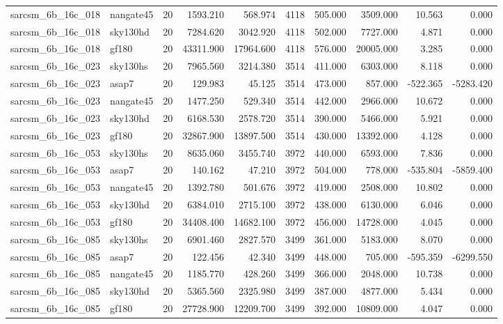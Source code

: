 \begin{longtable}{llrrrrrrrr}
sarcsm\_6b\_16c\_018 & nangate45 & 20 & 1593.210 & 568.974 & 4118 & 505.000 & 3509.000 & 10.563 & 0.000 \\
sarcsm\_6b\_16c\_018 & sky130hd & 20 & 7284.620 & 3042.920 & 4118 & 502.000 & 7727.000 & 4.871 & 0.000 \\
sarcsm\_6b\_16c\_018 & gf180 & 20 & 43311.900 & 17964.600 & 4118 & 576.000 & 20005.000 & 3.285 & 0.000 \\
sarcsm\_6b\_16c\_023 & sky130hs & 20 & 7965.560 & 3214.380 & 3514 & 411.000 & 6303.000 & 8.118 & 0.000 \\
sarcsm\_6b\_16c\_023 & asap7 & 20 & 129.983 & 45.125 & 3514 & 473.000 & 857.000 & -522.365 & -5283.420 \\
sarcsm\_6b\_16c\_023 & nangate45 & 20 & 1477.250 & 529.340 & 3514 & 442.000 & 2966.000 & 10.672 & 0.000 \\
sarcsm\_6b\_16c\_023 & sky130hd & 20 & 6168.530 & 2578.720 & 3514 & 390.000 & 5466.000 & 5.921 & 0.000 \\
sarcsm\_6b\_16c\_023 & gf180 & 20 & 32867.900 & 13897.500 & 3514 & 430.000 & 13392.000 & 4.128 & 0.000 \\
sarcsm\_6b\_16c\_053 & sky130hs & 20 & 8635.060 & 3455.740 & 3972 & 440.000 & 6593.000 & 7.836 & 0.000 \\
sarcsm\_6b\_16c\_053 & asap7 & 20 & 140.162 & 47.210 & 3972 & 504.000 & 778.000 & -535.804 & -5859.400 \\
sarcsm\_6b\_16c\_053 & nangate45 & 20 & 1392.780 & 501.676 & 3972 & 419.000 & 2508.000 & 10.802 & 0.000 \\
sarcsm\_6b\_16c\_053 & sky130hd & 20 & 6384.010 & 2715.100 & 3972 & 438.000 & 6130.000 & 6.046 & 0.000 \\
sarcsm\_6b\_16c\_053 & gf180 & 20 & 34408.400 & 14682.100 & 3972 & 456.000 & 14728.000 & 4.045 & 0.000 \\
sarcsm\_6b\_16c\_085 & sky130hs & 20 & 6901.460 & 2827.570 & 3499 & 361.000 & 5183.000 & 8.070 & 0.000 \\
sarcsm\_6b\_16c\_085 & asap7 & 20 & 122.456 & 42.340 & 3499 & 448.000 & 705.000 & -595.359 & -6299.550 \\
sarcsm\_6b\_16c\_085 & nangate45 & 20 & 1185.770 & 428.260 & 3499 & 366.000 & 2048.000 & 10.738 & 0.000 \\
sarcsm\_6b\_16c\_085 & sky130hd & 20 & 5365.560 & 2325.980 & 3499 & 387.000 & 4877.000 & 5.434 & 0.000 \\
sarcsm\_6b\_16c\_085 & gf180 & 20 & 27728.900 & 12209.700 & 3499 & 392.000 & 10809.000 & 4.047 & 0.000 \\

\end{longtable}
